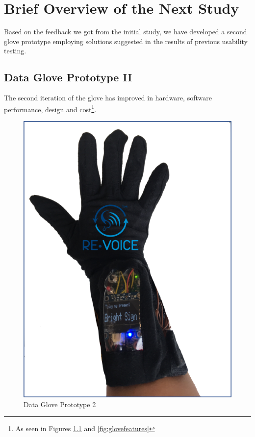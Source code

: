 \chapter{Brief Overview of the Next Study}

Based on the feedback we got from the initial study, we have developed a second glove prototype employing solutions suggested in the results of previous usability testing. 

\section{Data Glove Prototype II}

The second iteration of the glove has improved in hardware, software performance, design and cost\footnote{As seen in Figures \ref{fig:glove} and \ref{fig:glovefeatures}}.

\begin{figure}
    \centering
    \includegraphics{./assets/img/Glove}
    \caption{Data Glove Prototype 2}
    \label{fig:glove}
\end{figure}

